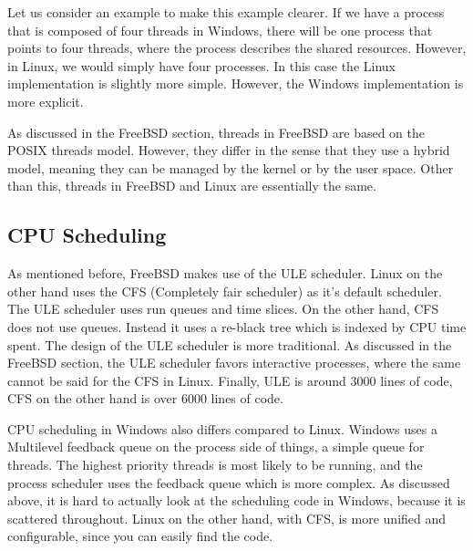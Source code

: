 \documentclass[letterpaper,10pt,titlepage,draftclsnofoot,onecolumn]{IEEEtran}
\begin{document}
Let us consider an example to make this example clearer. If we have a process that is composed of four threads in Windows, there will be one process that points to four threads, where the process describes the shared resources. However, in Linux, we would simply have four processes. \cite{linux} In this case the Linux implementation is slightly more simple. However, the Windows implementation is more explicit.

As discussed in the FreeBSD section, threads in FreeBSD are based on the POSIX threads model. However, they differ in the sense that they use a hybrid model, meaning they can be managed by the kernel or by the user space. Other than this, threads in FreeBSD and Linux are essentially the same. 

\subsection{CPU Scheduling}
As mentioned before, FreeBSD makes use of the ULE scheduler. Linux on the other hand uses the CFS (Completely fair scheduler) as it's default scheduler. The ULE scheduler uses run queues and time slices. On the other hand, CFS does not use queues. Instead it uses a re-black tree which is indexed by CPU time spent. The design of the ULE scheduler is more traditional. As discussed in the FreeBSD section, the ULE scheduler favors interactive processes, where the same cannot be said for the CFS in Linux. Finally, ULE is around 3000 lines of code, CFS on the other hand is over 6000 lines of code. 

CPU scheduling in Windows also differs compared to Linux. Windows uses a Multilevel feedback queue on the process side of things, a simple queue for threads. The highest priority threads is most likely to be running, and the process scheduler uses the feedback queue which is more complex. As discussed above, it is hard to actually look at the scheduling code in Windows, because it is scattered throughout. Linux on the other hand, with CFS, is more unified and configurable, since you can easily find the code. 



\end{document}
